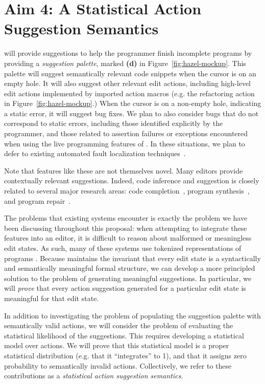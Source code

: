 \section{Aim 4: A Statistical Action Suggestion Semantics}
\label{sec:statistics}
\Hazel will provide suggestions to help the programmer finish incomplete
programs by providing a \emph{suggestion palette}, marked \textbf{(d)} in
Figure~\ref{fig:hazel-mockup}.  This palette will suggest semantically
relevant code  
snippets when the cursor is on an empty hole. It will also suggest other relevant
edit actions, including high-level edit actions implemented by imported action
macros (e.g. the refactoring action in Figure~\ref{fig:hazel-mockup}.)  When the
cursor is on a non-empty hole, indicating a static error, it will suggest
bug fixes. We plan to also consider bugs that do not correspond to static
errors, including those identified explicitly by the programmer, and those
related to assertion failures or exceptions encountered when using the live
programming features of \HazelEnv. In these situations, we plan to defer to
existing automated fault localization techniques~\citep{Jones02,
  Qi13issta,Renieris03}.

Note that features like these are not themselves novel. Many editors provide
contextually relevant suggestions. Indeed, code inference and suggestion is
closely related to several major research areas: code
completion~\citep{Muslu12icse-nier,icse-naturalness12}, program
synthesis~\citep{Gulwani2010}, and program
repair~\citep{legoues12tse,angelix,prophet,Ke15ase}.  

The problems that existing systems encounter is exactly the problem we have 
been discussing throughout this proposal: when attempting to integrate these 
features into an editor, it is difficult to reason about malformed or meaningless
edit states. As such, many of these systems use tokenized representations of programs \citep{icse-naturalness12}. Because \HazelEnv maintains the invariant that every
edit state is a syntactically and semantically meaningful formal structure, we can develop a
more principled solution to the problem of generating meaningful suggestions. In particular,
we will \emph{prove} that every action suggestion generated for a particular edit state is 
meaningful for that edit state.

In addition to investigating the problem of populating the suggestion palette
with semantically valid actions, we will consider the problem of evaluating
the statistical likelihood of the suggestions. This
requires developing a statistical model over actions.  We will prove that this statistical model is a
proper statistical distribution (e.g. that it ``integrates'' to 1), and that it
assigns zero probability to semantically invalid actions. Collectively, we refer 
to these contributions as a \emph{statistical action suggestion semantics}. 

